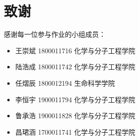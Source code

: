 \documentclass[a4paper]{ctexart}
\begin{document}
	\section{致谢}
	感谢每一位参与作业的小组成员：
	\begin{itemize}
		\item 王崇斌\,\,1800011716\,\,化学与分子工程学院
		\item 陆浩成\,\,1800011742\,\,化学与分子工程学院
		\item 任熠辰\,\,1800012194\,\,生命科学学院
		\item 李恒宇\,\,1900011794\,\,化学与分子工程学院
		\item 鲁承浩\,\,1900011828\,\,化学与分子工程学院
		\item 昌珺涵\,\,1700011741\,\,化学与分子工程学院
	\end{itemize}
	
	
\end{document}
